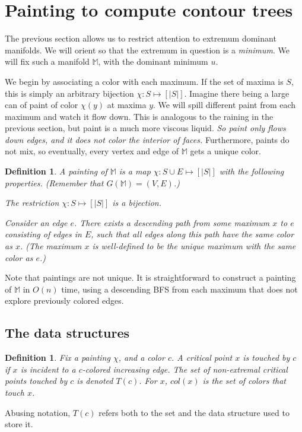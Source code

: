 \documentclass[11pt]{article}
\newtheorem{definition}[theorem]{Definition}
\theoremstyle{definition}
\newcommand{\MM}{\mathbb{M}}
\newcommand{\col}{col}
\newcommand{\touch}{T}
\begin{document}
\section{Painting to compute contour trees} \label{sec:paint}
The previous section allows us to restrict attention to extremum dominant manifolds.
We will orient so that the extremum in question is a \emph{minimum}.
We will fix such a manifold $\MM$, with the dominant minimum $u$. 

We begin by associating a color with each maximum. If the set of maxima is $S$,
this is simply an arbitrary bijection $\chi:S \mapsto [|S|]$. Imagine there being a large
can of paint of color $\chi(y)$ at maxima $y$. We will spill different paint from each maximum and watch it flow down.
This is analogous to the raining in the previous section, but paint is a much more viscous liquid.
\emph{So paint only flows down edges, and it does not color the interior of faces.} Furthermore, paints
do not mix, so eventually, every vertex and edge of $\MM$ gets a unique color.
%
\begin{definition} \label{def:paint} A  \emph{painting} of $\MM$ is a map $\chi:S \cup E \mapsto [|S|]$
with the following properties. (Remember that $G(\MM) = (V,E)$.)
\begin{asparaitem}
	\item The restriction $\chi:S \mapsto [|S|]$ is a bijection.
	\item Consider an edge $e$. There exists a descending path from some maximum $x$ to $e$
	consisting of edges in $E$, such that all edges along this path have the same color as $x$. (The maximum $x$
	is well-defined to be the unique maximum with the same color as $e$.)
\end{asparaitem}
\end{definition}
%
Note that paintings are not unique. It is straightforward to construct a painting of $\MM$ in $O(n)$ time, using a descending BFS from each maximum that does not explore previously colored edges. 

\subsection{The data structures} \label{sec:struct}

\begin{definition} \label{def:color-set} Fix a painting $\chi$, and a color $c$.
A critical point $x$ is \emph{touched by $c$} if $x$ is incident to a $c$-colored
increasing edge. The set of non-extremal critical points touched by $c$ is denoted $\touch(c)$.
For $x$, $\col(x)$ is the set of colors that touch $x$.
\end{definition}
%
Abusing notation, $\touch(c)$ refers
both to the set and the data structure used to store it.
\end{document}

